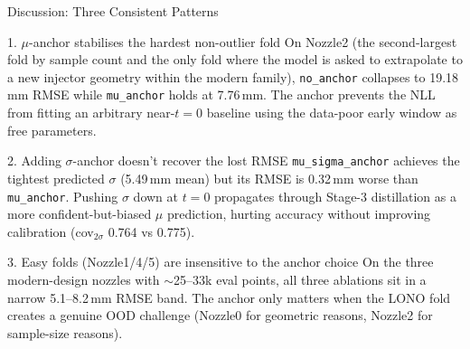 \documentclass[UTF8,aspectratio=169]{ctexbeamer}
\newcommand{\good}[1]{\textcolor{green!45!black}{#1}}
\newcommand{\warn}[1]{\textcolor{red!65!black}{#1}}
\newcommand{\bluenote}[1]{\textcolor{blue!65!black}{#1}}
\begin{document}
\begin{frame}{Discussion: Three Consistent Patterns}
\small
\begin{block}{1. \good{$\mu$-anchor stabilises the hardest non-outlier fold}}
On Nozzle2 (the second-largest fold by sample count and the only fold where the model is asked
to extrapolate to a new injector geometry within the modern family), \texttt{no\_anchor}
collapses to \warn{19.18\,mm RMSE} while \texttt{mu\_anchor} holds at 7.76\,mm. The anchor
prevents the NLL from fitting an arbitrary near-$t{=}0$ baseline using the data-poor early
window as free parameters.
\end{block}

\begin{block}{2. \warn{Adding $\sigma$-anchor doesn't recover the lost RMSE}}
\texttt{mu\_sigma\_anchor} achieves the tightest predicted $\sigma$ (5.49\,mm mean) but its
RMSE is 0.32\,mm worse than \texttt{mu\_anchor}. Pushing $\sigma$ down at $t{=}0$ propagates
through Stage-3 distillation as a more confident-but-biased $\mu$ prediction, hurting accuracy
without improving calibration (cov$_{2\sigma}$ 0.764 vs 0.775).
\end{block}

\begin{block}{3. \bluenote{Easy folds (Nozzle1/4/5) are insensitive to the anchor choice}}
On the three modern-design nozzles with $\sim$25--33k eval points, all three ablations sit in
a narrow 5.1--8.2\,mm RMSE band. The anchor only matters when the LONO fold creates a
genuine OOD challenge (Nozzle0 for geometric reasons, Nozzle2 for sample-size reasons).
\end{block}
\end{frame}
\end{document}

